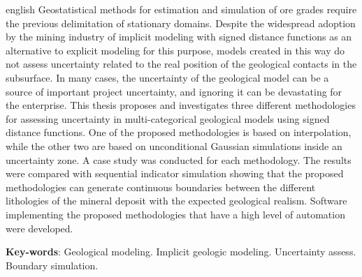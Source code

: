 \documentclass[
    oneside, %
	12pt,				%
	a4paper,			%
	chapter=TITLE,		%
	english,			%
	french,				%
	spanish,			%
	brazil				%
	]{dissertacao-ufrgs-abntex2}
\begin{document}
\begin{resumo}[Abstract]
 \begin{otherlanguage*}{english}
   Geostatistical methods for estimation and simulation of ore grades require the previous delimitation of stationary domains. Despite the widespread adoption by the mining industry of implicit modeling with signed distance functions as an alternative to explicit modeling for this purpose, models created in this way do not assess uncertainty related to the real position of the geological contacts in the subsurface. In many cases, the uncertainty of the geological model can be a source of important project uncertainty, and ignoring it can be devastating for the enterprise. This thesis proposes and investigates three different methodologies for assessing uncertainty in multi-categorical geological models using signed distance functions. One of the proposed methodologies is based on interpolation, while the other two are based on unconditional Gaussian simulations inside an uncertainty zone. A case study was conducted for each methodology. The results were compared with sequential indicator simulation showing that the proposed methodologies can generate continuous boundaries between the different lithologies of the mineral deposit with the expected geological realism. Software implementing the proposed methodologies that have a high level of automation were developed.

   \vspace{\onelineskip}
 
   \noindent 
   \textbf{Key-words}: Geological modeling. Implicit geologic modeling. Uncertainty assess. Boundary simulation.
 \end{otherlanguage*}
\end{resumo}


\listoffigures*
\cleardoublepage

\tableofcontents*
\cleardoublepage



\textual





\end{document}
